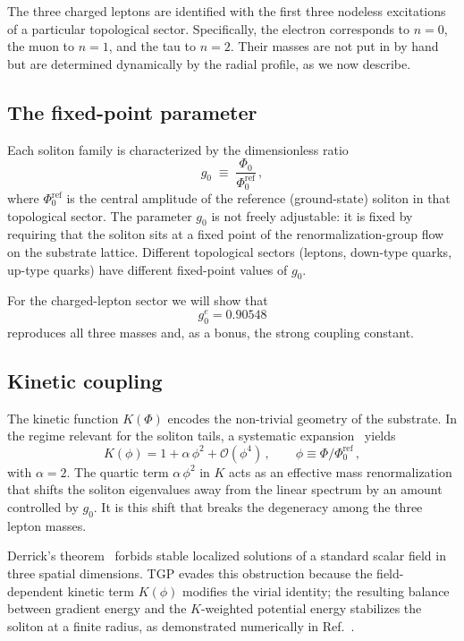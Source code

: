 \documentclass[11pt,a4paper]{article}
\newcommand{\gz}{g_0^e}
\begin{document}
The three charged leptons are identified with the first three
nodeless excitations of a particular topological sector.
Specifically, the electron corresponds to $n=0$, the muon to $n=1$,
and the tau to $n=2$.  Their masses are not put in by hand but are
determined dynamically by the radial profile, as we now describe.

\subsection{The fixed-point parameter}

Each soliton family is characterized by the dimensionless ratio
\begin{equation}\label{eq:g0def}
  g_0 \;\equiv\; \frac{\Phi_0}{\Phi_0^{\mathrm{ref}}}\,,
\end{equation}
where $\Phi_0^{\mathrm{ref}}$ is the central amplitude of the
reference (ground-state) soliton in that topological sector.
The parameter $g_0$ is not freely adjustable: it is fixed by
requiring that the soliton sits at a fixed point of the
renormalization-group flow on the substrate lattice.
Different topological sectors (leptons, down-type quarks, up-type
quarks) have different fixed-point values of $g_0$.

For the charged-lepton sector we will show that
\begin{equation}\label{eq:g0value}
  \gz = 0.90548
\end{equation}
reproduces all three masses and, as a bonus, the strong coupling
constant.

\subsection{Kinetic coupling}

The kinetic function $K(\Phi)$ encodes the non-trivial geometry
of the substrate.  In the regime relevant for the soliton tails,
a systematic expansion~\cite{Serafin2026-full} yields
\begin{equation}\label{eq:Kphi}
  K(\phi) = 1 + \alpha\,\phi^2 + \mathcal{O}(\phi^4)\,,
  \qquad
  \phi \equiv \Phi/\Phi_0^{\mathrm{ref}}\,,
\end{equation}
with $\alpha = 2$.  The quartic term $\alpha\,\phi^2$ in $K$ acts as
an effective mass renormalization that shifts the soliton eigenvalues
away from the linear spectrum by an amount controlled by $g_0$.
It is this shift that breaks the degeneracy among the three lepton
masses.

Derrick's theorem~\cite{Derrick1964} forbids stable localized
solutions of a standard scalar field in three spatial dimensions.
TGP evades this obstruction because the field-dependent kinetic
term $K(\phi)$ modifies the virial identity; the resulting
balance between gradient energy and the $K$-weighted potential
energy stabilizes the soliton at a finite radius, as demonstrated
numerically in Ref.~\cite{Serafin2026-full}.
\end{document}
